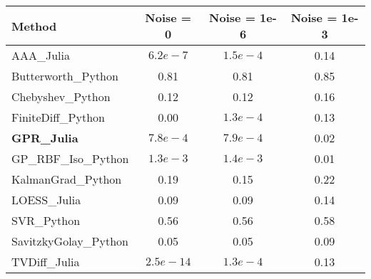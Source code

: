 \begin{tabular}{@{}l|ccc@{}}
\toprule
\textbf{Method} & \textbf{Noise = 0} & \textbf{Noise = 1e-6} & \textbf{Noise = 1e-3} \\
\midrule
AAA\_Julia & {\color{successgreen}$6.2e-7$} & {\color{successgreen}$1.5e-4$} & 0.14 \\
Butterworth\_Python & 0.81 & 0.81 & 0.85 \\
Chebyshev\_Python & 0.12 & 0.12 & 0.16 \\
FiniteDiff\_Python & {\color{successgreen}0.00} & {\color{successgreen}$1.3e-4$} & 0.13 \\
\textbf{GPR\_Julia} & {\color{successgreen}$7.8e-4$} & {\color{successgreen}$7.9e-4$} & {\color{successgreen}0.02} \\
GP\_RBF\_Iso\_Python & {\color{successgreen}$1.3e-3$} & {\color{successgreen}$1.4e-3$} & {\color{successgreen}0.01} \\
KalmanGrad\_Python & 0.19 & 0.15 & 0.22 \\
LOESS\_Julia & {\color{successgreen}0.09} & {\color{successgreen}0.09} & 0.14 \\
SVR\_Python & 0.56 & 0.56 & 0.58 \\
SavitzkyGolay\_Python & {\color{successgreen}0.05} & {\color{successgreen}0.05} & {\color{successgreen}0.09} \\
TVDiff\_Julia & {\color{successgreen}$2.5e-14$} & {\color{successgreen}$1.3e-4$} & 0.13 \\
\bottomrule
\end{tabular}

